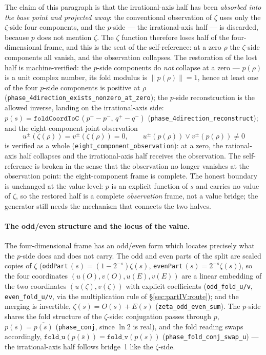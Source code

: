 \documentclass{article}
\newcommand{\zt}{\zeta}
\begin{document}
The claim of this paragraph is that the irrational-axis half has been
\emph{absorbed into the base point and projected away}: the
conventional observation of $\zt$ uses only the $\zt$-side four
components, and the $p$-side --- the irrational-axis half --- is
discarded, because $p$ does not mention $\zt$. The $\zt$ function
therefore loses half of the four-dimensional frame, and this is the
seat of the self-reference: at a zero $\rho$ the $\zt$-side components
all vanish, and the observation collapses. The restoration of the lost
half is machine-verified: the $p$-side components do \emph{not}
collapse at a zero --- $p(\rho)$ is a unit complex number, its fold
modulus is $\|p(\rho)\|=1$, hence at least one of the four $p$-side
components is positive at $\rho$
(\texttt{phase\_4direction\_exists\_nonzero\_at\_zero}); the $p$-side
reconstruction is the allowed inverse, landing on the irrational-axis
side: $p(s)=\texttt{foldCoordToC}\,(p^+-p^-,\,q^+-q^-)$
(\texttt{phase\_4direction\_reconstruct}); and the eight-component
joint observation
\begin{equation}
  u^\pm(\zt(\rho))=v^\pm(\zt(\rho))=0,\qquad
  u^\pm(p(\rho))\vee v^\pm(p(\rho))\ne0
\end{equation}
is verified as a whole (\texttt{eight\_component\_observation}): at a
zero, the rational-axis half collapses and the irrational-axis half
receives the observation. The self-reference is broken in the sense
that the observation no longer vanishes at the observation point: the
eight-component frame is complete. The honest boundary is unchanged at
the value level: $p$ is an explicit function of $s$ and carries no
value of $\zt$, so the restored half is a complete \emph{observation}
frame, not a value bridge; the generator still needs the mechanism
that connects the two halves.

\paragraph{The odd/even structure and the locus of the value.}
The four-dimensional frame has an odd/even form which locates
precisely what the $p$-side does and does not carry. The odd and even
parts of the split are scaled copies of $\zt$
(\texttt{oddPart}\,$(s)=(1-2^{-s})\zt(s)$,
\texttt{evenPart}\,$(s)=2^{-s}\zt(s)$), so the four coordinates
$(u(O),v(O),u(E),v(E))$ are a linear embedding of the two
coordinates $(u(\zt),v(\zt))$ with explicit coefficients
(\texttt{odd\_fold\_u/v}, \texttt{even\_fold\_u/v}, via the
multiplication rule of \S\ref{sec:partIV:route}); and the merging is
invertible, $\zt(s)=O(s)+E(s)$ (\texttt{zeta\_odd\_even\_sum}). The
$p$-side shares the fold structure of the $\zt$-side: conjugation
passes through $p$, $p(\bar s)=\overline{p(s)}$
(\texttt{phase\_conj}, since $\ln 2$ is real), and the fold reading
swaps accordingly, $\texttt{fold\_u}(p(\bar s))=\texttt{fold\_v}(p(s))$
(\texttt{phase\_fold\_conj\_swap\_u}) --- the irrational-axis half
follows bridge~1 like the $\zt$-side.
\end{document}
